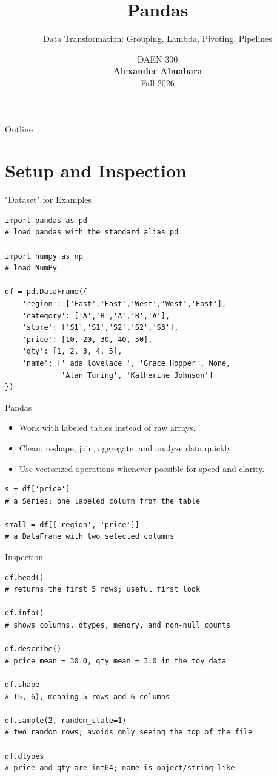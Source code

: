 \documentclass[11pt,aspectratio=43]{beamer}
\title{Pandas}
\subtitle{Data Transformation: Grouping, Lambda, Pivoting, Pipelines}
\author{}
\date{
  \textcolor{aggiemaroon}{
    DAEN 300\\
    \textbf{Alexander Abuabara}\\
    Fall 2026
  }
}
\begin{document}
\begin{frame}
  \titlepage
\end{frame}

\begin{frame}{Outline}
  \tableofcontents
\end{frame}

\section{Setup and Inspection}

\begin{frame}[fragile]{"Dataset" for Examples}
  \begin{lstlisting}
import pandas as pd
# load pandas with the standard alias pd

import numpy as np
# load NumPy

df = pd.DataFrame({
    'region': ['East','East','West','West','East'],
    'category': ['A','B','A','B','A'],
    'store': ['S1','S1','S2','S2','S3'],
    'price': [10, 20, 30, 40, 50],
    'qty': [1, 2, 3, 4, 5],
    'name': [' ada lovelace ', 'Grace Hopper', None,
             'Alan Turing', 'Katherine Johnson']
})
  \end{lstlisting}
\end{frame}

\begin{frame}[fragile]{Pandas}
  \begin{itemize}
    \item Work with labeled tables instead of raw arrays.
    \item Clean, reshape, join, aggregate, and analyze data quickly.
    \item Use vectorized operations whenever possible for speed and clarity.
  \end{itemize}
  \vspace{0.4em}
  \begin{lstlisting}
s = df['price']
# a Series; one labeled column from the table

small = df[['region', 'price']]
# a DataFrame with two selected columns
  \end{lstlisting}
\end{frame}

\begin{frame}[fragile]{Inspection}
  \begin{lstlisting}
df.head()
# returns the first 5 rows; useful first look

df.info()
# shows columns, dtypes, memory, and non-null counts

df.describe()
# price mean = 30.0, qty mean = 3.0 in the toy data

df.shape
# (5, 6), meaning 5 rows and 6 columns

df.sample(2, random_state=1)
# two random rows; avoids only seeing the top of the file

df.dtypes
# price and qty are int64; name is object/string-like
  \end{lstlisting}
\end{frame}
\end{document}
